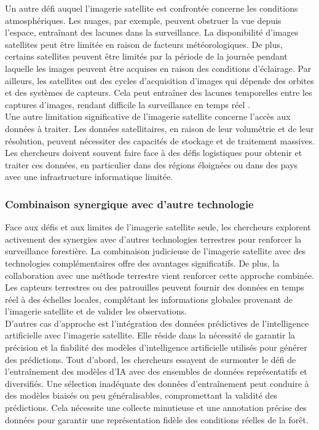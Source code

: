 Un autre défi auquel l'imagerie satellite est confrontée concerne les conditions atmosphériques. Les nuages, par exemple, peuvent obstruer la vue depuis l'espace, entraînant des lacunes dans la surveillance. La disponibilité d'images satellites peut être limitée en raison de facteurs météorologiques. De plus, certains satellites peuvent être limités par la période de la journée pendant laquelle les images peuvent être acquises en raison des conditions d'éclairage. Par ailleurs, les satellites ont des cycles d'acquisition d'images qui dépende des orbites et des systèmes de capteurs. Cela peut entraîner des lacunes temporelles entre les captures d'images, rendant difficile la surveillance en temps réel \cite{45}.
\\

Une autre limitation significative de l'imagerie satellite concerne l'accès aux données à traiter. Les données satellitaires, en raison de leur volumétrie et de leur résolution, peuvent nécessiter des capacités de stockage et de traitement massives. Les chercheurs doivent souvent faire face à des défis logistiques pour obtenir et traiter ces données, en particulier dans des régions éloignées ou dans des pays avec une infrastructure informatique limitée.
\\

\subsubsection{Combinaison synergique avec d’autre technologie}
Face aux défis et aux limites de l'imagerie satellite seule, les chercheurs explorent activement des synergies avec d'autres technologies terrestres pour renforcer la surveillance forestière. La combinaison judicieuse de l'imagerie satellite avec des technologies complémentaires offre des avantages significatifs. De plus, la collaboration avec une méthode terrestre vient renforcer cette approche combinée. Les capteurs terrestres ou des patrouilles peuvent fournir des données en temps réel à des échelles locales, complétant les informations globales provenant de l'imagerie satellite et de valider les observations.
\\

D’autres cas d’approche est l'intégration des données prédictives de l'intelligence artificielle avec l'imagerie satellite. Elle réside dans la nécessité de garantir la précision et la fiabilité des modèles d'intelligence artificielle utilisés pour générer des prédictions. Tout d'abord, les chercheurs essayent de surmonter le défi de l'entraînement des modèles d'IA avec des ensembles de données représentatifs et diversifiés. Une sélection inadéquate des données d'entraînement peut conduire à des modèles biaisés ou peu généralisables, compromettant la validité des prédictions. Cela nécessite une collecte minutieuse et une annotation précise des données pour garantir une représentation fidèle des conditions réelles de la forêt.


